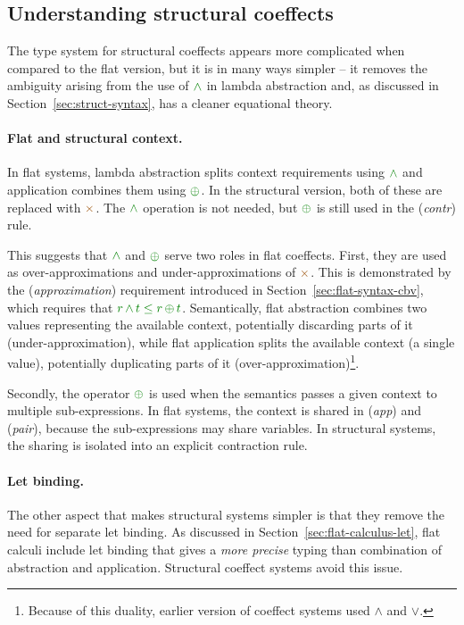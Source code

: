 \subsection{Understanding structural coeffects}

The type system for structural coeffects appears more complicated when compared to the flat
version, but it is in many ways simpler -- it removes the ambiguity arising from the use
of $\czip$ in lambda abstraction and, as discussed in Section~\ref{sec:struct-syntax}, has
a cleaner equational theory.

\paragraph{Flat and structural context.} In flat systems, lambda abstraction splits context
requirements using $\czip$ and application combines them using $\cpar$. In the structural
version, both of these are replaced with $\atimes$. The $\czip$ operation is not needed, but
$\cpar$ is still used in the (\emph{contr}) rule.

This suggests that $\czip$ and $\cpar$ serve two roles in flat coeffects. First, they are used
as over-approximations and under-approximations of $\atimes$. This is demonstrated by the 
(\emph{approximation}) requirement introduced in Section~\ref{sec:flat-syntax-cbv}, which requires that
$\cclrd{r}\,\czip\,\cclrd{t}\;\cleq\;\cclrd{r}\,\cpar\,\cclrd{t}$. Semantically, flat abstraction
combines two values representing the available context, potentially discarding parts of it 
(under-approximation), while flat application splits the available context (a single value), 
potentially duplicating parts of it (over-approxi\-mation)\footnote{Because of this duality, earlier 
version of coeffect systems \cite{coeffects-icalp13} used $\wedge$ and $\vee$.}.

Secondly, the operator $\cpar$ is used when the semantics passes a given context to multiple
sub-expressions. In flat systems, the context is shared in (\emph{app}) and (\emph{pair}), because 
the sub-expressions may share variables. In structural systems, the sharing is isolated into an 
explicit contraction rule.

\paragraph{Let binding.}
The other aspect that makes structural systems simpler is that they remove the need for 
separate let binding. As discussed in Section~\ref{sec:flat-calculus-let}, flat calculi include
let binding that gives a \emph{more precise} typing than combination of abstraction and 
application. Structural coeffect systems avoid this issue.

